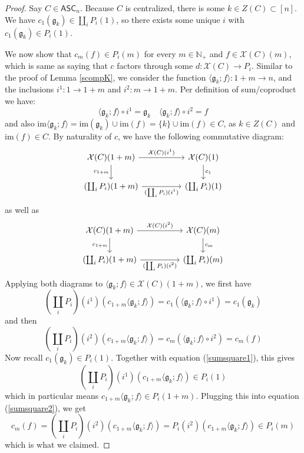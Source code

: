\documentclass{article}
\theoremstyle{remark}
\theoremstyle{definition}
\newcommand{\N}{\mathbb N}
\newcommand{\ASC}{\mathsf{ASC}}
\newcommand{\im}{\mathrm{im}}
\newcommand{\X}{\mathcal X}
\newcommand{\g}{\mathfrak g}
\begin{document}
	\begin{proof}
		Say $C\in\ASC_n$. Because $C$ is centralized, there is some $k\in Z(C)\subset[n]$. We have $c_1(\g_k)\in\coprod_iP_i(1)$, so there exists some unique $i$ with $c_1(\g_k)\in P_i(1)$.
		
		We now show that $c_m(f)\in P_i(m)$ for every $m\in\N_+$ and $f\in\X(C)(m)$, which is same as saying that $c$ factors through some $d:\X(C)\to P_i$. Similar to the proof of Lemma \ref{scompK}, we consider the function $\langle\g_k;f\rangle:1+m\to n$, and the inclusions $i^1:1\to1+m$ and $i^2:m\to1+m$. Per definition of sum/coproduct we have:
		\[\langle\g_k;f\rangle\circ i^1=\g_k\quad\langle\g_k;f\rangle\circ i^2=f\]
		and also $\im\langle\g_k;f\rangle=\im(\g_k)\cup\im(f)=\{k\}\cup\im(f)\in C$, as $k\in Z(C)$ and $\im(f)\in C$. By naturality of $c$, we have the following commutative diagram:
		\[\begin{tikzcd}
			\X(C)(1+m)\arrow{rr}{\X(C)(i^1)}\arrow{d}[swap]{c_{1+m}}&&
			\X(C)(1)\arrow{d}{c_1}\\
			(\coprod_iP_i)(1+m)\arrow{rr}[swap]{(\coprod_iP_i)(i^1)}&&
			(\coprod_iP_i)(1)
		\end{tikzcd}\]
		as well as
		\[\begin{tikzcd}
			\X(C)(1+m)\arrow{rr}{\X(C)(i^2)}\arrow{d}[swap]{c_{1+m}}&&
			\X(C)(m)\arrow{d}{c_m}\\
			(\coprod_iP_i)(1+m)\arrow{rr}[swap]{(\coprod_iP_i)(i^2)}&&
			(\coprod_iP_i)(m)
		\end{tikzcd}\]
		Applying both diagrams to $\langle\g_k;f\rangle\in\X(C)(1+m)$, we first have
		\begin{equation}\label{sumsquare1}
			\left(\coprod_iP_i\right)(i^1)(c_{1+m}\langle\g_k;f\rangle)=c_1(\langle\g_k;f\rangle\circ i^1)=c_1(\g_k)
		\end{equation}
		and then
		\begin{equation}\label{sumsquare2}
			\left(\coprod_iP_i\right)(i^2)(c_{1+m}\langle\g_k;f\rangle)=c_m(\langle\g_k;f\rangle\circ i^2)=c_m(f)
		\end{equation}
		Now recall $c_1(\g_k)\in P_i(1)$. Together with equation (\ref{sumsquare1}), this gives
		\[\left(\coprod_iP_i\right)(i^1)(c_{1+m}\langle\g_k;f\rangle)\in P_i(1)\]
		which in particular means $c_{1+m}\langle\g_k;f\rangle\in P_i(1+m)$. Plugging this into equation (\ref{sumsquare2}), we get
		\[c_m(f)=\left(\coprod_iP_i\right)(i^2)(c_{1+m}\langle\g_k;f\rangle)=P_i(i^2)(c_{1+m}\langle\g_k;f\rangle)\in P_i(m)\]
		which is what we claimed.
	\end{proof}
\end{document}
